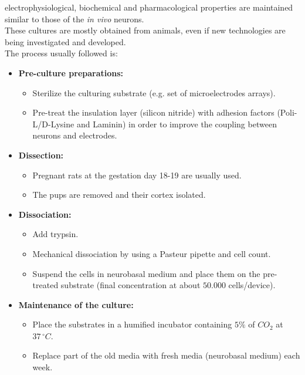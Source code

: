electrophysiological, biochemical and pharmacological properties are
maintained similar to those of the \textit{in vivo} neurons.\\
These cultures are mostly obtained from animals, even if new technologies
are being investigated and developed.\\
The process usually followed is:
\begin{itemize}
      \item \textbf{Pre-culture preparations:}
            \begin{itemize}
                  \item Sterilize the culturing substrate (e.g. set of
                        microelectrodes arrays).
                  \item Pre-treat the insulation layer (silicon nitride) with
                        adhesion factors (Poli-L/D-Lysine and Laminin) in order to improve the
                        coupling between neurons and electrodes.
            \end{itemize}
      \item \textbf{Dissection:}
            \begin{itemize}
                  \item Pregnant rats at the gestation day 18-19 are usually used.
                  \item The pups are removed and their cortex isolated.
            \end{itemize}
      \item \textbf{Dissociation:}
            \begin{itemize}
                  \item Add trypsin.
                  \item Mechanical dissociation by using a Pasteur pipette and cell
                        count.
                  \item Suspend the cells in neurobasal medium and place them on the
                        pre-treated substrate (final concentration at about \(50.000\) cells/device).
            \end{itemize}
      \item \textbf{Maintenance of the culture:}
            \begin{itemize}
                  \item Place the substrates in a humified incubator containing \(5\%\)
                        of \(CO_2\) at \(37\,{}^{\circ}C\).
                  \item Replace part of the old media with fresh media (neurobasal
                        medium) each week.
            \end{itemize}
\end{itemize}
